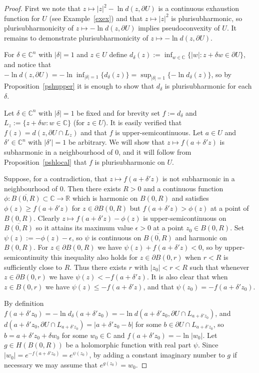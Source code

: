 \documentclass[11pt,a4paper, final, twoside]{article}
\numberwithin{equation}{section}
\newcommand{\C}{\mathbb C}
\newcommand{\R}{\mathbb R}
\newcommand{\clos}[1]{\overline{#1}}
\newcommand{\bd}{\partial}
\newcommand{\ball}{B}
\newcommand{\emetric}{d}
\newcommand{\hol}{H}
\begin{document}
\begin{proof}
First we note that $z\mapsto |z|^2-\ln\emetric(z,\bd U)$ is a continuous exhaustion function for $U$ (see Example~\ref{exex}) and that $z\mapsto |z|^2$ is plurisubharmonic, so
plurisubharmonicity of $z\mapsto -\ln\emetric(z,\bd U)$ implies pseudoconvexity of $U$. It remains to demonstrate plurisubharmonicity of $z\mapsto -\ln\emetric(z,\bd U)$.

For $\delta\in\C^n$ with $|\delta|=1$ and $z\in U$ define $\emetric_\delta(z):=\inf_{w\in\C}\{|w|\colon z+\delta w\in\bd U\}$, and notice that
$-\ln\emetric(z,\bd U)=-\ln\inf_{|\delta|=1} \{\emetric_\delta(z)\}=\sup_{|\delta|=1}\{-\ln \emetric_\delta(z)\}$, 
so by Proposition~\ref{pshupper} it is enough to show that
$\emetric_\delta$ is plurisubharmonic for each $\delta$. 

Let $\delta\in\C^n$ with $|\delta|=1$ be fixed and for brevity set $f:=\emetric_\delta$ and  
$L_z:=\{z+\delta w\colon w\in\C\}$ (for $z\in U$). It is easily verified that $f(z)=\emetric(z,\bd U\cap L_z)$ and that $f$ is upper-semicontinuous.
Let $a\in U$ and $\delta'\in\C^n$ with $|\delta'|=1$ be arbitrary. We will show that $z\mapsto f(a+\delta' z)$ is subharmonic in a neighbourhood of $0$, and it will follow from Proposition~\ref{pshlocal}
that $f$
is plurisubharmonic on $U$. 

Suppose, for a contradiction, that $z\mapsto f(a+\delta' z)$ is not subharmonic in a neighbourhood of $0$. Then there exists $R>0$
and a continuous function $\phi\colon\clos{\ball(0,R)}\subset\C\to\R$ which is harmonic on $\ball(0,R)$ and satisfies $\phi(z)\geq f(a+\delta' z)$ for $z\in\bd\ball(0,R)$
but $f(a+\delta' z)>\phi(z)$ at a point of $\ball(0,R)$. Clearly $z\mapsto f(a+\delta' z)-\phi(z)$ is upper-semicontinuous on $\clos{\ball(0,R)}$ so it attains
its maximum value $\epsilon>0$ at a point $z_0\in\ball(0,R)$. Set $\psi(z):=-\phi(z)-\epsilon$, so $\psi$ is continuous on $\clos{\ball(0,R)}$ and
harmonic on $\ball(0,R)$. For $z\in\bd\ball(0,R)$ we have $\psi(z)+f(a+\delta'z)<0$, so by upper-semicontinuity this inequality also holds for $z\in\bd\ball(0,r)$ when $r<R$
is sufficiently close to $R$. Thus there exists $r$ with $|z_0|<r<R$ such that whenever $z\in\bd\ball(0,r)$ we have $\psi(z)<-f(a+\delta'z)$.
It is also clear that
when $z\in\ball(0,r)$
we have $\psi(z)\leq -f(a+\delta' z)$, and that $\psi(z_0)=-f(a+\delta'z_0)$.


By definition 
$f(a+\delta' z_0)=-\ln \emetric_\delta(a+\delta'z_0)=-\ln\emetric(a+\delta' z_0,\bd U\cap L_{a+\delta'z_0})$,
and $\emetric(a+\delta'z_0,\bd U\cap L_{a+\delta'z_0})=|a+\delta'z_0-b|$ for some $b\in\bd U\cap L_{a+\delta'z_0}$,
so $b=a+\delta'z_0+\delta w_0$ for some $w_0\in\C$
and $f(a+\delta' z_0)=-\ln|w_0|$. 
Let $g\in\hol(\ball(0,R))$ be a holomorphic function with real part $\psi$.
Since $|w_0|=e^{-f(a+\delta'z_0)}=e^{\psi(z_0)}$, by adding a constant imaginary number to $g$ if necessary we may assume that $e^{g(z_0)}=w_0$. 


\end{proof}
\end{document}
